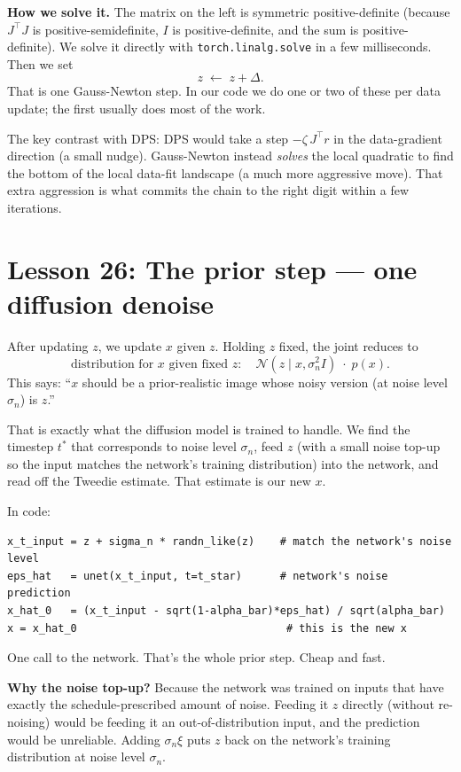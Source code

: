 \documentclass[11pt]{article}
\begin{document}
\textbf{How we solve it.} The matrix on the left is symmetric
positive-definite (because $J^\top J$ is positive-semidefinite, $I$
is positive-definite, and the sum is positive-definite). We solve it
directly with \texttt{torch.linalg.solve} in a few milliseconds. Then
we set
\[
z \;\leftarrow\; z + \Delta.
\]
That is one Gauss-Newton step. In our code we do one or two of these
per data update; the first usually does most of the work.

\begin{intuition}
The key contrast with DPS: DPS would take a step $-\zeta\,J^\top r$
in the data-gradient direction (a small nudge). Gauss-Newton instead
\emph{solves} the local quadratic to find the bottom of the local
data-fit landscape (a much more aggressive move). That extra
aggression is what commits the chain to the right digit within a few
iterations.
\end{intuition}

\section{Lesson 26: The prior step --- one diffusion denoise}

After updating $z$, we update $x$ given $z$. Holding $z$ fixed, the
joint reduces to
\[
\text{distribution for }x\text{ given fixed }z:\quad
\mathcal{N}(z \mid x, \sigma_n^2 I) \;\cdot\; p(x).
\]
This says: ``$x$ should be a prior-realistic image whose noisy version
(at noise level $\sigma_n$) is $z$.''

That is exactly what the diffusion model is trained to handle. We find
the timestep $t^*$ that corresponds to noise level $\sigma_n$, feed
$z$ (with a small noise top-up so the input matches the network's
training distribution) into the network, and read off the Tweedie
estimate. That estimate is our new $x$.

In code:
\begin{verbatim}
x_t_input = z + sigma_n * randn_like(z)    # match the network's noise level
eps_hat   = unet(x_t_input, t=t_star)      # network's noise prediction
x_hat_0   = (x_t_input - sqrt(1-alpha_bar)*eps_hat) / sqrt(alpha_bar)
x = x_hat_0                                 # this is the new x
\end{verbatim}

One call to the network. That's the whole prior step. Cheap and fast.

\textbf{Why the noise top-up?} Because the network was trained on
inputs that have exactly the schedule-prescribed amount of noise.
Feeding it $z$ directly (without re-noising) would be feeding it an
out-of-distribution input, and the prediction would be unreliable.
Adding $\sigma_n \xi$ puts $z$ back on the network's training
distribution at noise level $\sigma_n$.
\end{document}
